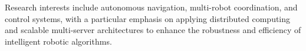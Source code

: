 Research interests include autonomous navigation, multi-robot coordination, and control systems, with a particular emphasis on applying distributed computing and scalable multi-server architectures to enhance the robustness and efficiency of intelligent robotic algorithms.